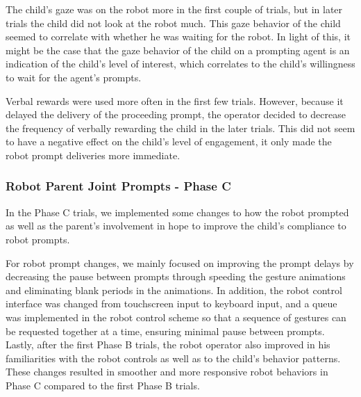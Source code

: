The child's gaze was on the robot more in the first couple of trials, but in later trials the child did not look at the robot much.  This gaze behavior of the child seemed to correlate with whether he was waiting for the robot.  In light of this, it might be the case that the gaze behavior of the child on a prompting agent is an indication of the child's level of interest, which correlates to the child's willingness to wait for the agent's prompts.

Verbal rewards were used more often in the first few trials.  However, because it delayed the delivery of the proceeding prompt, the operator decided to decrease the frequency of verbally rewarding the child in the later trials.  This did not seem to have a negative effect on the child's level of engagement, it only made the robot prompt deliveries more immediate.

\subsubsection{Robot Parent Joint Prompts - Phase C}
In the Phase C trials, we implemented some changes to how the robot prompted as well as the parent's involvement in hope to improve the child's compliance to robot prompts.

For robot prompt changes, we mainly focused on improving the prompt delays by decreasing the pause between prompts through speeding the gesture animations and eliminating blank periods in the animations.  In addition, the robot control interface was changed from touchscreen input to keyboard input, and a queue was implemented in the robot control scheme so that a sequence of gestures can be requested together at a time, ensuring minimal pause between prompts.  Lastly, after the first Phase B trials, the robot operator also improved in his familiarities with the robot controls as well as to the child's behavior patterns.  These changes resulted in smoother and more responsive robot behaviors in Phase C compared to the first Phase B trials.


